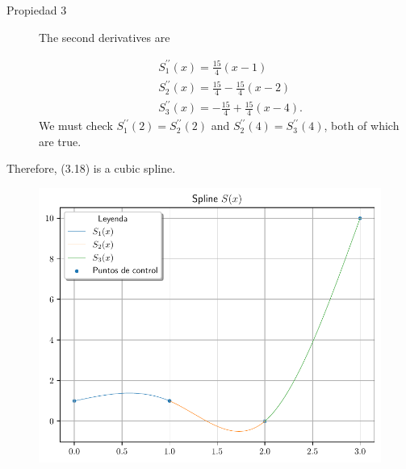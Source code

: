 \begin{frame}
    \begin{solution}
        \begin{description}
            \item[Propiedad 3]

                The second derivatives are

                \begin{align*}
                     & S_1^{\prime\prime}\left(x\right)=\frac{15}{4}(x-1)                 \\
                     & S_2^{\prime\prime}\left(x\right)=\frac{15}{4}-\frac{15}{4}(x-2)    \\
                     & S_3^{\prime\prime}\left(x\right)=-\frac{15}{4}+\frac{15}{4}(x-4) .
                \end{align*}
                We must check $S_1^{\prime \prime}(2)=S_2^{\prime \prime}(2)$ and $S_2^{\prime \prime}(4)=S_3^{\prime \prime}(4)$, both of which are true.
        \end{description}
        Therefore, (3.18) is a cubic spline.
    \end{solution}
\end{frame}

\begin{frame}
    \begin{solution}
        \begin{figure}[ht!]
            \centering
            \includegraphics[width=.72\paperwidth]{p5}
        \end{figure}
    \end{solution}
\end{frame}